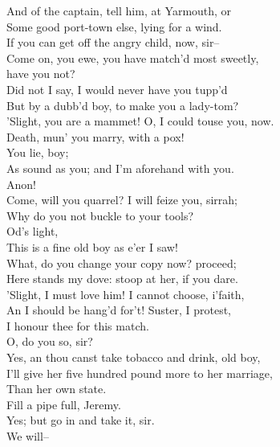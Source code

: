 \documentclass{memoir}
\begin{document}
\begin{drama*}
 And of the captain, tell him, at Yarmouth, or\\
 Some good port-town else, lying for a wind.\\
 If you can get off the angry child, now, sir--\\
\kastrilspeaks  Come on, you ewe, you have match'd most sweetly,\\
 have you not?\\
 Did not I say, I would never have you tupp'd\\
 But by a dubb'd boy, to make you a lady-tom?\\
 'Slight, you are a mammet! O, I could touse you, now.\\
 Death, mun' you marry, with a pox!\\
\lovewitspeaks {} You lie, boy;\\
 As sound as you; and I'm aforehand with you.\\
\kastrilspeaks  Anon!\\
\lovewitspeaks {} Come, will you quarrel? I will feize you, sirrah;\\
 Why do you not buckle to your tools?\\
\kastrilspeaks {} Od's light,\\
 This is a fine old boy as e'er I saw!\\
\lovewitspeaks  What, do you change your copy now? proceed;\\
 Here stands my dove: stoop at her, if you dare.\\
\kastrilspeaks  'Slight, I must love him! I cannot choose, i'faith,\\
 An I should be hang'd for't! Suster, I protest,\\
 I honour thee for this match.\\
\lovewitspeaks {} O, do you so, sir?\\
\kastrilspeaks  Yes, an thou canst take tobacco and drink, old boy,\\
 I'll give her five hundred pound more to her marriage,\\
 Than her own state.\\
\lovewitspeaks {} Fill a pipe full, Jeremy.\\
\facespeaks  Yes; but go in and take it, sir.\\
\lovewitspeaks {} We will--\\

\end{drama*}
\end{document}
